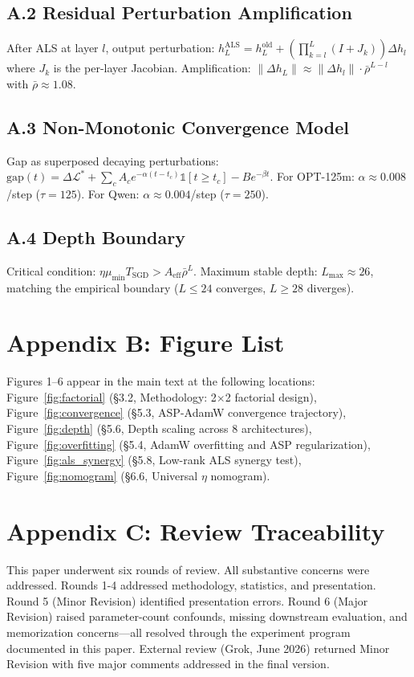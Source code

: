 \documentclass[11pt]{article}
\begin{document}
\subsection*{A.2 Residual Perturbation Amplification}

After ALS at layer $l$, output perturbation: $h_L^{\text{ALS}} = h_L^{\text{old}} + (\prod_{k=l}^{L} (I + J_k)) \Delta h_l$ where $J_k$ is the per-layer Jacobian. Amplification: $\|\Delta h_L\| \approx \|\Delta h_l\| \cdot \bar{\rho}^{L-l}$ with $\bar{\rho} \approx 1.08$.

\subsection*{A.3 Non-Monotonic Convergence Model}

Gap as superposed decaying perturbations: $\text{gap}(t) = \Delta\mathcal{L}^* + \sum_c A_c e^{-\alpha(t-t_c)}\mathbb{1}[t \geq t_c] - B e^{-\beta t}$. For OPT-125m: $\alpha \approx 0.008$/step ($\tau=125$). For Qwen: $\alpha \approx 0.004$/step ($\tau=250$).

\subsection*{A.4 Depth Boundary}

Critical condition: $\eta \mu_{\min} T_{\text{SGD}} > A_{\text{eff}} \bar{\rho}^L$. Maximum stable depth: $L_{\max} \approx 26$, matching the empirical boundary ($L \leq 24$ converges, $L \geq 28$ diverges).

\section*{Appendix B: Figure List}

Figures 1--6 appear in the main text at the following locations:
Figure~\ref{fig:factorial} (\S3.2, Methodology: 2$\times$2 factorial design),
Figure~\ref{fig:convergence} (\S5.3, ASP-AdamW convergence trajectory),
Figure~\ref{fig:depth} (\S5.6, Depth scaling across 8 architectures),
Figure~\ref{fig:overfitting} (\S5.4, AdamW overfitting and ASP regularization),
Figure~\ref{fig:als_synergy} (\S5.8, Low-rank ALS synergy test),
Figure~\ref{fig:nomogram} (\S6.6, Universal $\eta$ nomogram).

\section*{Appendix C: Review Traceability}

This paper underwent six rounds of review. All substantive concerns were addressed. Rounds 1-4 addressed methodology, statistics, and presentation. Round 5 (Minor Revision) identified presentation errors. Round 6 (Major Revision) raised parameter-count confounds, missing downstream evaluation, and memorization concerns---all resolved through the experiment program documented in this paper. External review (Grok, June 2026) returned Minor Revision with five major comments addressed in the final version.
\end{document}
